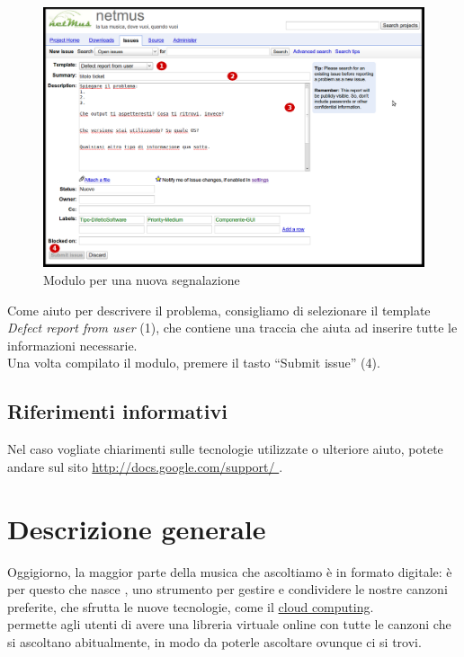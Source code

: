 \begin{figure}[!htbp]
  \centering
  \includegraphics[width=16cm]{img/MU/new_issue.png}
\caption{Modulo per una nuova segnalazione}
\label{fig:newIssue}
\end{figure}

Come aiuto per descrivere il problema, consigliamo di selezionare il template
\emph{Defect report from user} (1), che contiene una traccia che aiuta ad
inserire tutte le informazioni necessarie.\\

Una volta compilato il modulo, premere il tasto ``Submit issue'' (4).

\section{Riferimenti informativi}
Nel caso vogliate chiarimenti sulle tecnologie utilizzate o ulteriore aiuto,
potete andare sul sito \url{http://docs.google.com/support/
} .

\chapter{Descrizione generale}
\thispagestyle{fancy}
Oggigiorno, la maggior parte della musica che ascoltiamo \`e in formato digitale: \`e
per questo che nasce , uno strumento per gestire e condividere le
nostre canzoni preferite, che sfrutta le nuove tecnologie, come il
\underline{cloud computing}.\\

 permette agli utenti di avere una
libreria virtuale online con tutte le canzoni che si ascoltano abitualmente, in modo da
poterle ascoltare ovunque ci si trovi.\\

